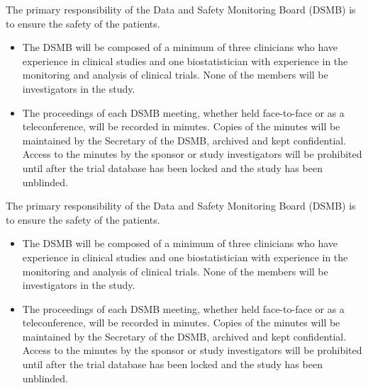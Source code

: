 The primary responsibility of the Data and Safety Monitoring Board (DSMB) is to ensure the safety of the patients.
\begin{itemize}
	\item The DSMB will be composed of a minimum of three clinicians who have experience in clinical studies  and one biostatistician with experience in the monitoring and analysis of clinical trials.  None of the members will be investigators in the study.
	\item The proceedings of each DSMB meeting, whether held face-to-face or as a teleconference, will be recorded in minutes.  Copies of the minutes will be maintained by the Secretary of the DSMB, archived and kept confidential.  Access to the minutes by the sponsor or study investigators will be prohibited until after the trial database has been locked and the study has been unblinded.
\end{itemize}

The primary responsibility of the Data and Safety Monitoring Board (DSMB) is to ensure the safety of the patients.
\begin{itemize}
	\item The DSMB will be composed of a minimum of three clinicians who have experience in clinical studies  and one biostatistician with experience in the monitoring and analysis of clinical trials.  None of the members will be investigators in the study.
	\item The proceedings of each DSMB meeting, whether held face-to-face or as a teleconference, will be recorded in minutes.  Copies of the minutes will be maintained by the Secretary of the DSMB, archived and kept confidential.  Access to the minutes by the sponsor or study investigators will be prohibited until after the trial database has been locked and the study has been unblinded.
\end{itemize}